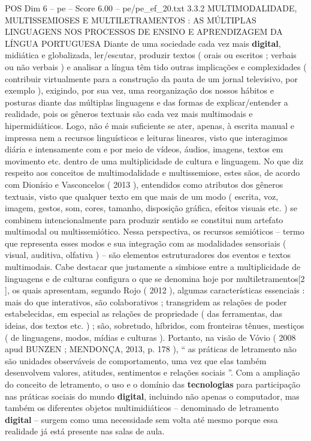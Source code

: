 \begin{textsample}{POS Dim 6 – pe – Score 6.00 – pe/pe\_ef\_20.txt}  \label{ex:f6_pos_257}
3.3.2 MULTIMODALIDADE, MULTISSEMIOSES E MULTILETRAMENTOS : AS MÚLTIPLAS LINGUAGENS NOS PROCESSOS DE ENSINO E APRENDIZAGEM DA LÍNGUA PORTUGUESA Diante de uma sociedade cada vez mais \textbf{digital}, midiática e globalizada, ler/escutar, produzir textos ( orais ou escritos ; verbais ou não verbais ) e analisar a língua têm tido outras implicações e complexidades ( contribuir virtualmente para a construção da pauta de um jornal televisivo, por exemplo ), exigindo, por sua vez, uma reorganização dos nossos hábitos e posturas diante das múltiplas linguagens e das formas de explicar/entender a realidade, pois os gêneros textuais são cada vez mais multimodais e hipermidiáticos.
Logo, não é mais suficiente se ater, apenas, à escrita manual e impressa nem a recursos linguísticos e leituras lineares, visto que interagimos diária e intensamente com e por meio de vídeos, áudios, imagens, textos em movimento etc. dentro de uma multiplicidade de cultura e linguagem.
No que diz respeito aos conceitos de multimodalidade e multissemiose, estes sãos, de acordo com Dionísio e Vasconcelos ( 2013 ), entendidos como atributos dos gêneros textuais, visto que qualquer texto em que mais de um modo ( escrita, voz, imagem, gestos, som, cores, tamanho, disposição gráfica, efeitos visuais etc. ) se combinem intencionalmente para produzir sentido se constitui num artefato multimodal ou multissemiótico.
Nessa perspectiva, os recursos semióticos – termo que representa esses modos e sua integração com as modalidades sensoriais ( visual, auditiva, olfativa ) – são elementos estruturadores dos eventos e textos multimodais.
Cabe destacar que justamente a simbiose entre a multiplicidade de linguagens e de culturas configura o que se denomina hoje por multiletramentos[2 ], os quais apresentam, segundo Rojo ( 2012 ), algumas características essenciais : mais do que interativos, são colaborativos ; transgridem as relações de poder estabelecidas, em especial as relações de propriedade ( das ferramentas, das ideias, dos textos etc. ) ; são, sobretudo, híbridos, com fronteiras tênues, mestiços ( de linguagens, modos, mídias e culturas ).
Portanto, na visão de Vóvio ( 2008 apud BUNZEN ; MENDONÇA, 2013, p. 178 ), “ as práticas de letramento não são unidades observáveis de comportamento, uma vez que elas também desenvolvem valores, atitudes, sentimentos e relações sociais ”.
Com a ampliação do conceito de letramento, o uso e o domínio das \textbf{tecnologias} para participação nas práticas sociais do mundo \textbf{digital}, incluindo não apenas o computador, mas também os diferentes objetos multimidiáticos – denominado de letramento \textbf{digital} – surgem como uma necessidade sem volta até mesmo porque essa realidade já está presente nas salas de aula.

\end{textsample}
